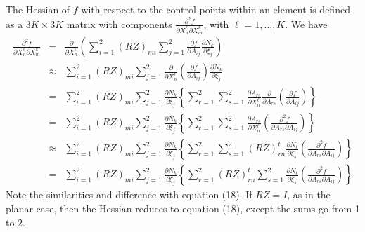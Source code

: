  \newline
The Hessian of $f$ with respect to the control points within an element is 
defined as a $3K \times 3K$ matrix with components $\frac{\partial^2 f}{\partial X_n^\ell \partial X_m^k}$, with $\ell=1,\ldots,K$.  We have
\begin{eqnarray}
\frac{\partial^2 f}{\partial X_n^\ell \partial X_m^k} & = & \frac{\partial}{\partial X_n^\ell} \left( \sum_{i=1}^2  \left( RZ \right)_{mi} \sum_{j=1}^2 \frac{\partial f}{\partial A_{ij}} \frac{\partial N_k}{\partial \xi_j} \right) \nonumber \\
& \approx &\sum_{i=1}^2 \left( RZ \right)_{mi} \sum_{j=1}^2  \frac{\partial}{\partial X_n^\ell}  \left( \frac{\partial f}{\partial A_{ij}} \right) \frac{\partial N_k}{\partial \xi_j} \nonumber \\
& = & \sum_{i=1}^2  \left( RZ \right)_{mi} \sum_{j=1}^2  \frac{\partial N_k}{\partial \xi_j} \left\{ \sum_{r=1}^2 \sum_{s=1}^2 \frac{\partial A_{rs}}{\partial X_{n}^\ell} \frac{\partial}{\partial A_{rs}}  \left(  \frac{\partial f}{\partial A_{ij}}  \right) \right\}  \nonumber \\
& = & \sum_{i=1}^2  \left( RZ \right)_{mi} \sum_{j=1}^2  \frac{\partial N_k}{\partial \xi_j} \left\{ \sum_{r=1}^2 \sum_{s=1}^2 \frac{\partial A_{rs}}{\partial X_{n}^\ell} \left(  \frac{\partial^2 f}{\partial A_{rs} \partial A_{ij}}  \right) \right\}  \nonumber \\
& \approx & \sum_{i=1}^2  \left( RZ \right)_{mi} \sum_{j=1}^2 \frac{\partial N_k}{\partial \xi_j} \left\{ \sum_{r=1}^2 \sum_{s=1}^2 \left( RZ \right)_{rn}^t \frac{\partial N_\ell}{\partial \xi_s} \left( \frac{\partial^2 f}{\partial A_{rs} \partial A_{ij}}  \right)  \right\}  \nonumber \\
& = & \sum_{i=1}^2  \left( RZ \right)_{mi} \sum_{j=1}^2 \frac{\partial N_k}{\partial \xi_j} \left\{ \sum_{r=1}^2  \left( RZ \right)_{rn}^t \sum_{s=1}^2 \frac{\partial N_\ell}{\partial \xi_s} \left( \frac{\partial^2 f}{\partial A_{rs} \partial A_{ij}}  \right)  \right\} 
\end{eqnarray}
Note the similarities and difference with equation (18). If 
$RZ = I$, as in the planar case, then the Hessian reduces to equation (18),
except the sums go from 1 to 2.\newline



